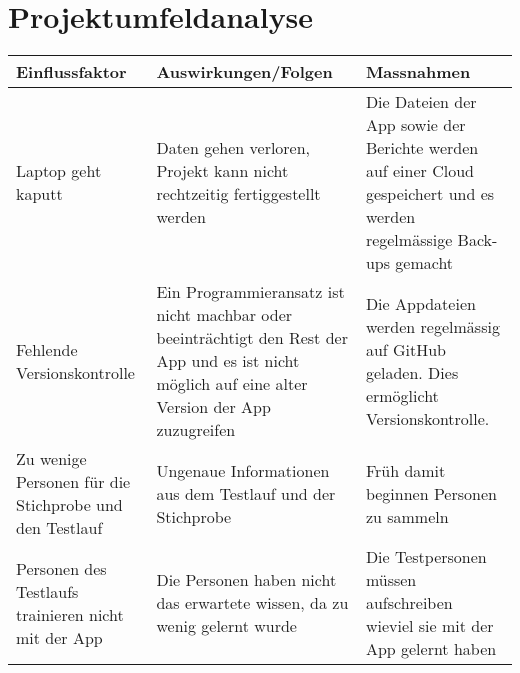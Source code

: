 \section{Projektumfeldanalyse}
\begin{tabularx}{\textwidth}{p{}|X|X}
    \textbf{Einflussfaktor} & \textbf{Auswirkungen/Folgen} & \textbf{Massnahmen} \\ \hline
    Laptop geht kaputt & Daten gehen verloren, Projekt kann nicht rechtzeitig fertiggestellt werden & Die Dateien der App sowie der Berichte werden auf einer Cloud gespeichert und es werden regelmässige Back-ups gemacht\\ \hline
    Fehlende Versionskontrolle & Ein Programmieransatz ist nicht machbar oder beeinträchtigt den Rest der App und es ist nicht möglich auf eine alter Version der App zuzugreifen & Die Appdateien werden regelmässig auf GitHub geladen. Dies ermöglicht Versionskontrolle. \\ \hline
    Zu wenige Personen für die Stichprobe und den Testlauf & Ungenaue Informationen aus dem Testlauf und der Stichprobe & Früh damit beginnen Personen zu sammeln \\ \hline
    Personen des Testlaufs trainieren nicht mit der App & Die Personen haben nicht das erwartete wissen, da zu wenig gelernt wurde & Die Testpersonen müssen aufschreiben wieviel sie mit der App gelernt haben \\
\end{tabularx}